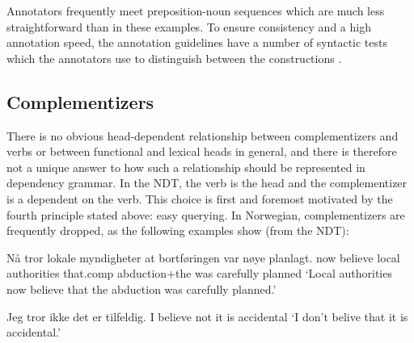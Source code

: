 \documentclass[11pt,a4paper]{article}
\begin{document}
Annotators frequently meet preposition-noun sequences which are much less straightforward than in these examples.
To ensure consistency and a high annotation speed, the annotation guidelines have a number of syntactic tests which the annotators use to distinguish between the constructions \cite[54-56]{Kin:Sol:Eri:2013}.

\subsection{Complementizers}
There is no obvious head-dependent relationship between complementizers and verbs or between functional and lexical heads in general, and there is therefore not a unique answer to how such a relationship should be represented in dependency grammar.
In the NDT, the verb is the head and the complementizer is a dependent on the verb. This choice is first and foremost motivated by the fourth principle stated above: easy querying. In Norwegian, complementizers are frequently dropped, as the following examples show (from the NDT):
\begin{examples}
\item\label{ex:medat}
\gll Nå tror lokale myndigheter at bortføringen var nøye planlagt.
now believe local authorities that.comp abduction+the was carefully planned
\glt `Local authorities now believe that the abduction was carefully planned.'
\glend

\item\label{ex:utenat}
\gll Jeg tror ikke det er tilfeldig.
I believe not it is accidental
\glt `I don't belive that it is accidental.'
\glend
\end{examples}
\end{document}
